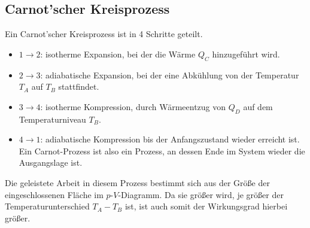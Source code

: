 \documentclass[12pt,a4paper,titlepage,headinclude,bibtotoc]{scrartcl}
\begin{document}
\subsection{Carnot'scher Kreisprozess}
Ein Carnot'scher Kreisprozess ist in 4 Schritte geteilt.
\begin{itemize}
\item $1\rightarrow 2$: isotherme Expansion, bei der die Wärme $Q_C$ hinzugeführt wird.
\item $2\rightarrow 3$: adiabatische Expansion, bei der eine Abkühlung von der Temperatur $T_A$ auf $T_B$ stattfindet.
\item $3\rightarrow 4$: isotherme Kompression, durch Wärmeentzug von $Q_D$ auf dem Temperaturniveau $T_B$.
\item $4\rightarrow 1$: adiabatische Kompression bis der Anfangszustand wieder erreicht ist.
	Ein Carnot-Prozess ist also ein Prozess, an dessen Ende im System wieder die Ausgangslage ist.
\end{itemize}
Die geleistete Arbeit in diesem Prozess bestimmt sich aus der Größe der eingeschlossenen Fläche im $p$-$V$-Diagramm.
Da sie größer wird, je größer der Temperaturunterschied $T_A-T_B$ ist, ist auch somit der Wirkungsgrad hierbei größer.
\end{document}
